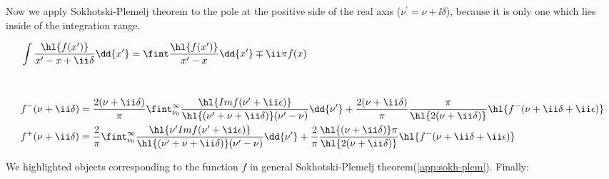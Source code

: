 Now we apply Sokhotski-Plemelj theorem to the pole at the positive side of the real axis ($\nu^\prime = \nu+\ii \delta$), because it is only one which lies inside of the integration range.

\begin{align}
    &\int \frac{\hl{f(x^\prime)}}{x^\prime - x + \ii \delta} \dd{x^\prime} = \fint \frac{\hl{f(x^\prime)}}{x^\prime - x} \dd{x^\prime} \mp \ii \pi f(x) \label{app:sokh-plem} \\[1cm]
    &f^{-}(\nu+\ii \delta) = \frac{2 (\nu+\ii \delta)}{\pi} \fint_{\nu_0}^{\infty} \frac{\hl{Im f(\nu^\prime+\ii \epsilon)}}{\hl{(\nu^\prime + \nu + \ii \delta)}(\nu^\prime - \nu)} \dd{\nu^\prime} + \frac{2 (\nu+\ii \delta)}{\pi} \frac{\pi}{\hl{2 (\nu + \ii \delta)}} \hl{f^{-}(\nu + \ii \delta + \ii \epsilon)} \\
    &f^{+}(\nu+\ii \delta) = \frac{2}{\pi} \fint_{\nu_0}^{\infty} \frac{\hl{\nu^\prime Im f(\nu^\prime+\ii \epsilon)}}{\hl{(\nu^\prime + \nu + \ii \delta)}(\nu^\prime - \nu)} \dd{\nu^\prime} + \frac{2}{\pi} \frac{\hl{(\nu + \ii \delta)} \pi}{\hl{2 (\nu + \ii \delta)}} \hl{f^{-}(\nu + \ii \delta + \ii \epsilon)}
\end{align}

We highlighted objects corresponding to the function $f$ in general Sokhotski-Plemelj theorem(\cref{app:sokh-plem}). Finally: \\[1cm]

